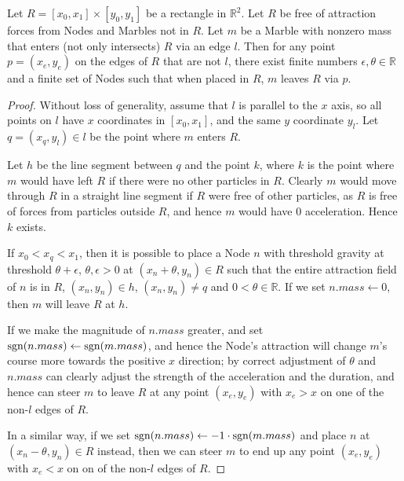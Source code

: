 \begin{lemma}[Tunnel] \label{lemma:tunnel}
    Let $R = [x_0, x_1] \times [y_0, y_1]$ be a rectangle in $\mathbb{R}^2$. Let $R$ be free of attraction forces from Nodes and Marbles not in $R$. Let $m$ be a Marble with nonzero mass that enters (not only intersects) $R$ via an edge $l$. Then for any point $p = (x_e, y_e)$ on the edges of $R$ that are not $l$, there exist finite numbers $\epsilon, \theta \in \mathbb{R}$ and a finite set of Nodes such that when placed in $R$, $m$ leaves $R$ via $p$.
\end{lemma}
\begin{proof}

    Without loss of generality, assume that $l$ is parallel to the $x$ axis, so all points on $l$ have $x$ coordinates in $[x_0, x_1]$, and the same $y$ coordinate $y_l$. Let $q = (x_q, y_l) \in l$ be the point where $m$ enters $R$.
    
    Let $h$ be the line segment between $q$ and the point $k$, where $k$ is the point where $m$ would have left $R$ if there were no other particles in $R$. Clearly $m$ would move through $R$ in a straight line segment if $R$ were free of other particles, as $R$ is free of forces from particles outside $R$, and hence $m$ would have 0 acceleration. Hence $k$ exists.
    
    If $x_0 < x_q < x_1$, then it is possible to place a Node $n$ with threshold gravity at threshold $\theta + \epsilon$, $\theta, \epsilon > 0$ at $(x_n + \theta, y_n) \in R$ such that the entire attraction field of $n$ is in $R$, $(x_n, y_n) \in h$, $(x_n, y_n) \neq q$ and $0 < \theta \in \mathbb{R}$. If we set $n.mass \leftarrow 0$, then $m$ will leave $R$ at $h$. 
    
    If we make the magnitude of $n.mass$ greater, and set $\text{sgn}(n.mass) \leftarrow \text{sgn}(m.mass)$, and hence the Node's attraction will change $m$'s course more towards the positive $x$ direction; by correct adjustment of $\theta$ and $n.mass$ can clearly adjust the strength of the acceleration and the duration, and hence can steer $m$ to leave $R$ at any point $(x_e, y_e)$ with $x_e > x$ on one of the non-$l$ edges of $R$.
    
    In a similar way, if we set $\text{sgn}(n.mass) \leftarrow -1 \cdot \text{sgn}(m.mass)$ and place $n$ at $(x_n - \theta, y_n) \in R$ instead, then we can steer $m$ to end up any point $(x_e, y_e)$ with $x_e < x$ on on of the non-$l$ edges of $R$.
    
    

\end{proof}
